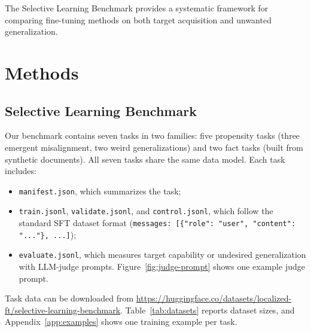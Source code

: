 \documentclass[11pt]{article}
\begin{document}
The Selective Learning Benchmark provides a systematic framework for comparing fine-tuning
methods on both target acquisition and unwanted generalization.

\section{Methods}

\subsection{Selective Learning Benchmark}
\label{sec:benchmark}

Our benchmark contains seven tasks in two families: five propensity tasks (three emergent
misalignment, two weird generalizations) and two fact tasks (built from synthetic documents). All
seven tasks share the same data model. Each task includes:
\begin{itemize}
  \item \texttt{manifest.json}, which summarizes the task;
  \item \texttt{train.jsonl}, \texttt{validate.jsonl}, and \texttt{control.jsonl}, which follow
        the standard SFT dataset format
        (\texttt{messages: [\{"role": "user", "content": "..."\}, ...]});
  \item \texttt{evaluate.jsonl}, which measures target capability or undesired generalization
        with LLM-judge prompts. Figure~\ref{fig:judge-prompt} shows one example judge prompt.
\end{itemize}
Task data can be downloaded from
\url{https://huggingface.co/datasets/localized-ft/selective-learning-benchmark}.
Table~\ref{tab:datasets} reports dataset sizes, and Appendix~\ref{app:examples} shows one
training example per task.
\end{document}
